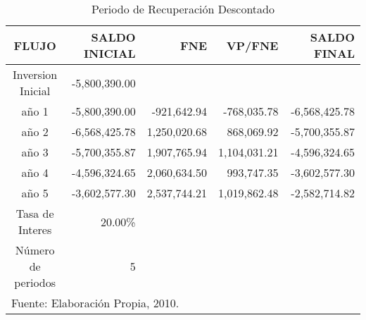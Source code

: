 \begin{table}
    \caption{Periodo de Recuperación Descontado}
    \label{tbl:Recuperacion:Descontado}
    \centering
    \begin{tabular}{c|r|r|r|r}
        FLUJO              & SALDO INICIAL & FNE          & VP/FNE         & SALDO FINAL \\
        \hline
        \hline
        Inversion Inicial  & -5,800,390.00 &              &                &  \\
        \hline
        año 1              & -5,800,390.00 & -921,642.94  & -768,035.78    & -6,568,425.78 \\
        año 2              & -6,568,425.78 & 1,250,020.68 & 868,069.92     & -5,700,355.87 \\
        año 3              & -5,700,355.87 & 1,907,765.94 & 1,104,031.21   & -4,596,324.65 \\
        año 4              & -4,596,324.65 & 2,060,634.50 & 993,747.35     & -3,602,577.30 \\
        año 5              & -3,602,577.30 & 2,537,744.21 & 1,019,862.48   & -2,582,714.82 \\
        \hline
        Tasa de Interes    & 20.00\% \\
        Número de periodos & 5 \\
        \hline
        \multicolumn{5}{l}{\footnotesize Fuente: Elaboración Propia, 2010.}
    \end{tabular}
\end{table}

















